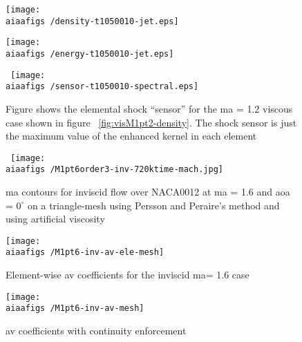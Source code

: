 \begin{figure}
\centering
\begin{minipage}[t]{.5\textwidth}
  \centering
  \texttt{[image: \\aiaafigs /density-t1050010-jet.eps]}
  \label{fig:visM1pt2-density}
\end{minipage}%
\begin{minipage}[t]{.5\textwidth}
  \centering
  \texttt{[image: \\aiaafigs /energy-t1050010-jet.eps]}
  \label{fig:visM1pt2-energy}
\end{minipage}
\end{figure} 

\begin{figure}[h] \tt
\centering
\texttt{[image: \\aiaafigs /sensor-t1050010-spectral.eps]}
\caption{Figure shows the elemental shock ``sensor'' for the \gls{ma} = 1.2 viscous case shown in figure ~\ref{fig:visM1pt2-density}. The shock sensor is just the maximum value of the enhanced kernel in each element}
\label{fig:sensor}
\end{figure}

\begin{figure}[h] \tt
\centering
\texttt{[image: \\aiaafigs /M1pt6order3-inv-720ktime-mach.jpg]} \\
\caption{\gls{ma} contours for inviscid flow over NACA0012 at \gls{ma} = 1.6 and \gls{aoa} = $0^{\circ} $ on a triangle-mesh using Persson and Peraire's method and using artificial viscosity}
\label{fig:inv_mach}
\end{figure}

\begin{figure}
\centering
\begin{minipage}[t]{.55\textwidth}
  \centering
  \texttt{[image: \\aiaafigs /M1pt6-inv-av-ele-mesh]}
  \caption{Element-wise \gls{av} coefficients for the inviscid \gls{ma}= 1.6 case}
  \label{fig:AV-ele}
\end{minipage}%
\begin{minipage}[t]{.55\textwidth}
  \centering
  \texttt{[image: \\aiaafigs /M1pt6-inv-av-mesh]}
  \caption{\gls{av} coefficients with continuity enforcement}
  \label{fig:AV-cont}
\end{minipage}
\end{figure} 

